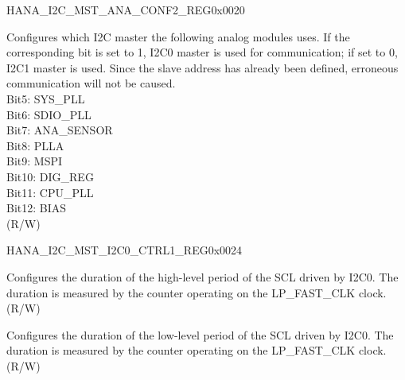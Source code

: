 \begin{register}{H}{ANA\_I2C\_MST\_ANA\_CONF2\_REG}{0x0020}\label{regdesc:ANAI2CMSTANACONF2REG}
%
%
\regnewline%
\begin{regdesc}\begin{reglist}
\label{fielddesc:ANAI2CMSTANACONF2}\item [ANA\_I2C\_MST\_ANA\_CONF2] Configures which I2C master the following analog modules uses. If the corresponding bit is set to 1, I2C0 master is used for communication; if set to 0, I2C1 master is used. Since the slave address has already been defined, erroneous communication will not be caused.\\ 
Bit5: SYS\_PLL\\
Bit6: SDIO\_PLL\\
Bit7: ANA\_SENSOR\\
Bit8: PLLA\\
Bit9: MSPI\\
Bit10: DIG\_REG\\
Bit11: CPU\_PLL\\
Bit12: BIAS\\
(R/W)
\end{reglist}\end{regdesc}
\end{register}


\begin{register}{H}{ANA\_I2C\_MST\_I2C0\_CTRL1\_REG}{0x0024}\label{regdesc:ANAI2CMSTI2C0CTRL1REG}
%
%
%
\regnewline%
\begin{regdesc}\begin{reglist}
\label{fielddesc:ANAI2CMSTI2C0SCLPULSEDUR}\item [ANA\_I2C\_MST\_I2C0\_SCL\_PULSE\_DUR] Configures the duration of the high-level period of the SCL driven by I2C0. The duration is measured by the counter operating on the LP\_FAST\_CLK clock. (R/W)
\label{fielddesc:ANAI2CMSTI2C0SDASIDEGUARD}\item [ANA\_I2C\_MST\_I2C0\_SDA\_SIDE\_GUARD]Configures the duration of the low-level period of the SCL driven by I2C0. The duration is measured by the counter operating on the LP\_FAST\_CLK clock. (R/W)
\end{reglist}\end{regdesc}
\end{register}



